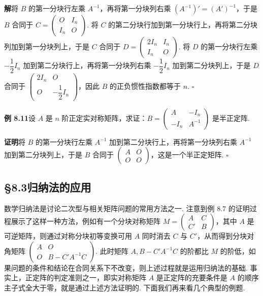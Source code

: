 \documentclass[UTF8,12pt,a4paper,fontset=fandol]{ctexart}
\begin{document}
\noindent\textbf{解}\quad 将 $B$ 的第一分块行左乘 $A^{-1}$，再将第一分块列右乘 $(A^{-1})'=(A')^{-1}$，于是 $B$ 合同于 $C=\left(\begin{array}{cc}O&I_n\\ I_n&O\end{array}\right)$. 将 $C$ 的第二分块行加到第一分块行上，再将第二分块列加到第一分块列上，于是 $C$ 合同于 $D=\left(\begin{array}{cc}2I_n&I_n\\ I_n&O\end{array}\right)$. 将 $D$ 的第一分块行左乘 $-\dfrac12 I_n$ 加到第二分块行上，再将第一分块列右乘 $-\dfrac12 I_n$ 加到第二分块列上，于是 $D$ 合同于 $\left(\begin{array}{cc}2I_n&O\\ O&-\dfrac12 I_n\end{array}\right)$，因此 $B$ 的正负惯性指数都等于 $n$. $\ensuremath{\square}$

\noindent\textbf{例 8.11}\quad 设 $A$ 是 $n$ 阶正定实对称矩阵，求证：$B=\left(\begin{array}{cc}A&-I_n\\ -I_n&A^{-1}\end{array}\right)$ 是半正定阵.

\noindent\textbf{证明}\quad 将 $B$ 的第一分块行左乘 $A^{-1}$ 加到第二分块行上，再将第一分块列右乘 $A^{-1}$ 加到第二分块列上，于是 $B$ 合同于 $\left(\begin{array}{cc}A&O\\ O&O\end{array}\right)$，这是一个半正定矩阵. $\ensuremath{\square}$

\subsection*{§8.3\quad 归纳法的应用}

数学归纳法是讨论二次型与相关矩阵问题的常用方法之一. 注意到例 8.7 的证明过程展示了这样一种方法，例如有一个分块对称矩阵 $M=\left(\begin{array}{cc}A&C\\ C'&B\end{array}\right)$，其中 $A$ 是可逆矩阵，则通过对称分块初等变换可用 $A$ 同时消去 $C$ 与 $C'$，从而得到分块对角矩阵 $\left(\begin{array}{cc}A&O\\ O&B-C'A^{-1}C\end{array}\right)$. 此时矩阵 $A,B-C'A^{-1}C$ 的阶都比 $M$ 的阶低，如果问题的条件和结论在合同关系下不改变，则上述过程就是运用归纳法的基础. 事实上，正定阵的判定准则之一，即实对称矩阵 $A$ 是正定阵的充要条件是 $A$ 的顺序主子式全大于零，就是通过上述方法证明的. 下面我们再来看几个典型的例题.
\end{document}

